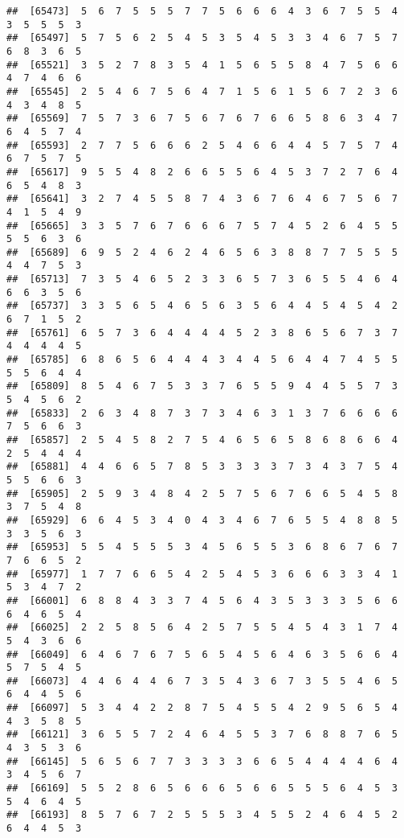 \documentclass[
]{book}
\begin{document}
\begin{verbatim}
##  [65473]  5  6  7  5  5  5  7  7  5  6  6  6  4  3  6  7  5  5  4  3  5  5  5  3
##  [65497]  5  7  5  6  2  5  4  5  3  5  4  5  3  3  4  6  7  5  7  6  8  3  6  5
##  [65521]  3  5  2  7  8  3  5  4  1  5  6  5  5  8  4  7  5  6  6  4  7  4  6  6
##  [65545]  2  5  4  6  7  5  6  4  7  1  5  6  1  5  6  7  2  3  6  4  3  4  8  5
##  [65569]  7  5  7  3  6  7  5  6  7  6  7  6  6  5  8  6  3  4  7  6  4  5  7  4
##  [65593]  2  7  7  5  6  6  6  2  5  4  6  6  4  4  5  7  5  7  4  6  7  5  7  5
##  [65617]  9  5  5  4  8  2  6  6  5  5  6  4  5  3  7  2  7  6  4  6  5  4  8  3
##  [65641]  3  2  7  4  5  5  8  7  4  3  6  7  6  4  6  7  5  6  7  4  1  5  4  9
##  [65665]  3  3  5  7  6  7  6  6  6  7  5  7  4  5  2  6  4  5  5  5  5  6  3  6
##  [65689]  6  9  5  2  4  6  2  4  6  5  6  3  8  8  7  7  5  5  5  4  4  7  5  3
##  [65713]  7  3  5  4  6  5  2  3  3  6  5  7  3  6  5  5  4  6  4  6  6  3  5  6
##  [65737]  3  3  5  6  5  4  6  5  6  3  5  6  4  4  5  4  5  4  2  6  7  1  5  2
##  [65761]  6  5  7  3  6  4  4  4  4  5  2  3  8  6  5  6  7  3  7  4  4  4  4  5
##  [65785]  6  8  6  5  6  4  4  4  3  4  4  5  6  4  4  7  4  5  5  5  5  6  4  4
##  [65809]  8  5  4  6  7  5  3  3  7  6  5  5  9  4  4  5  5  7  3  5  4  5  6  2
##  [65833]  2  6  3  4  8  7  3  7  3  4  6  3  1  3  7  6  6  6  6  7  5  6  6  3
##  [65857]  2  5  4  5  8  2  7  5  4  6  5  6  5  8  6  8  6  6  4  2  5  4  4  4
##  [65881]  4  4  6  6  5  7  8  5  3  3  3  3  7  3  4  3  7  5  4  5  5  6  6  3
##  [65905]  2  5  9  3  4  8  4  2  5  7  5  6  7  6  6  5  4  5  8  3  7  5  4  8
##  [65929]  6  6  4  5  3  4  0  4  3  4  6  7  6  5  5  4  8  8  5  3  3  5  6  3
##  [65953]  5  5  4  5  5  5  3  4  5  6  5  5  3  6  8  6  7  6  7  7  6  6  5  2
##  [65977]  1  7  7  6  6  5  4  2  5  4  5  3  6  6  6  3  3  4  1  5  3  4  7  2
##  [66001]  6  8  8  4  3  3  7  4  5  6  4  3  5  3  3  3  5  6  6  6  4  6  5  4
##  [66025]  2  2  5  8  5  6  4  2  5  7  5  5  4  5  4  3  1  7  4  5  4  3  6  6
##  [66049]  6  4  6  7  6  7  5  6  5  4  5  6  4  6  3  5  6  6  4  5  7  5  4  5
##  [66073]  4  4  6  4  4  6  7  3  5  4  3  6  7  3  5  5  4  6  5  6  4  4  5  6
##  [66097]  5  3  4  4  2  2  8  7  5  4  5  5  4  2  9  5  6  5  4  4  3  5  8  5
##  [66121]  3  6  5  5  7  2  4  6  4  5  5  3  7  6  8  8  7  6  5  4  3  5  3  6
##  [66145]  5  6  5  6  7  7  3  3  3  3  6  6  5  4  4  4  4  6  4  3  4  5  6  7
##  [66169]  5  5  2  8  6  5  6  6  6  5  6  6  5  5  5  6  4  5  3  5  4  6  4  5
##  [66193]  8  5  7  6  7  2  5  5  5  3  4  5  5  2  4  6  4  5  2  6  4  4  5  3

\end{verbatim}
\end{document}
